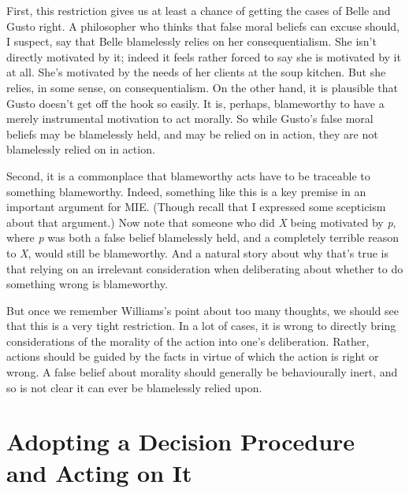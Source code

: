\documentclass[
  10pt,
  letterpaper,
  twoside]{scrbook}
\begin{document}
First, this restriction gives us at least a chance of getting the cases
of {Belle} and {Gusto} right. A philosopher who thinks that false moral
beliefs can excuse should, I suspect, say that {Belle} blamelessly
relies on her consequentialism. She isn't directly motivated by it;
indeed it feels rather forced to say she is motivated by it at all.
She's motivated by the needs of her clients at the soup kitchen. But she
relies, in some sense, on consequentialism. On the other hand, it is
plausible that {Gusto} doesn't get off the hook so easily. It is,
perhaps, blameworthy to have a merely instrumental motivation to act
morally. So while {Gusto}'s false moral beliefs may be blamelessly held,
and may be relied on in action, they are not blamelessly relied on in
action.

Second, it is a commonplace that blameworthy acts have to be traceable
to something blameworthy. Indeed, something like this is a key premise
in an important argument for MIE. (Though recall that I expressed some
scepticism about that argument.) Now note that someone who did \emph{X}
being motivated by \emph{p}, where \emph{p} was both a false belief
blamelessly held, and a completely terrible reason to \emph{X}, would
still be blameworthy. And a natural story about why that's true is that
relying on an irrelevant consideration when deliberating about whether
to do something wrong is blameworthy.

But once we remember Williams's point about too many thoughts, we should
see that this is a very tight restriction. In a lot of cases, it is
wrong to directly bring considerations of the morality of the action
into one's deliberation. Rather, actions should be guided by the facts
in virtue of which the action is right or wrong. A false belief about
morality should generally be behaviourally inert, and so is not clear it
can ever be blamelessly relied upon.

\section{Adopting a Decision Procedure and Acting on
It}\label{adoptingadecisionprocedureandactingonit}
\end{document}
